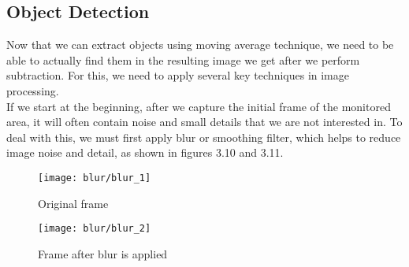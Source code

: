 	\subsection{Object Detection}
	Now that we can extract objects using moving average technique, we need to be able to actually find them in the resulting image we get after we perform subtraction. For this, we need to apply several key techniques in image processing. \\If we start at the beginning, after we capture the initial frame of the monitored area, it will often contain noise and small details that we are not interested in. To deal with this, we must first apply blur or smoothing filter, which helps to reduce image noise and detail, as shown in figures 3.10 and 3.11.
	\begin{figure}[ht]
		\begin{minipage}[b]{0.50 \linewidth}
		\centering
		\texttt{[image: blur/blur\_1]}
		\caption{Original frame}
		\end{minipage}
		\begin{minipage}[b]{0.50 \linewidth}
		\centering
		\texttt{[image: blur/blur\_2]}
		\caption{Frame after blur is applied}
		\end{minipage}
	\end{figure}
